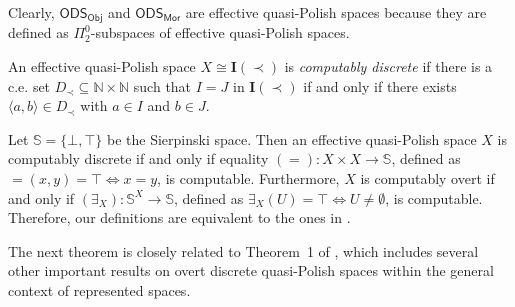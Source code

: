 \documentclass[envcountsame]{llncs}
\def\lpi#1{{\Pi}^0_{#1}}
\def\IN{{\mathbb N}}
\def\I#1{{{\mathrm{\mathbf I}}(#1)}}
\newcommand{\cntSets}{{\mathsf{ODS}}}
\newcommand{\Mor}{\mathsf{Mor}}
\newcommand{\Obj}{\mathsf{Obj}}
\def\sierp{{\mathbb S}}
\begin{document}
Clearly, $\cntSets_\Obj$ and $\cntSets_\Mor$ are effective quasi-Polish spaces because they are defined as $\lpi 2$-subspaces of effective quasi-Polish spaces. 



An effective quasi-Polish space $X\cong \I{\prec}$ is \emph{computably discrete} if there is a c.e. set $D_\prec \subseteq \IN\times\IN$ such that $I = J$ in $\I{\prec}$ if and only if there exists $\langle a,b\rangle\in D_\prec$ with $a \in I$ and $b \in J$.


Let $\sierp=\{\bot,\top\}$ be the Sierpinski space. Then an effective quasi-Polish space $X$ is computably discrete if and only if equality $(=)\colon X\times X\to\sierp$, defined as ${=}(x,y)=\top \iff x=y$, is computable. Furthermore, $X$ is computably overt if and only if $(\exists_X)\colon \sierp^X\to\sierp$, defined as $\exists_X(U) =\top \iff U\not=\emptyset$, is computable. Therefore, our definitions are equivalent to the ones in \cite{ME04,P16}.


The next theorem is closely related to Theorem~1 of \cite{NPPV25}, which includes several other important results on overt discrete quasi-Polish spaces within the general context of represented spaces.
\end{document}
